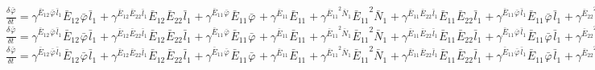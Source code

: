 $\frac{{\delta}^{} {\bar{\varphi}}_{}}{{\delta} {{{t}}_{}}^{}} = {\gamma}^{{{{\bar{E}}_{12}}^{}{{\bar{\varphi}}_{}}^{}{{\bar{l}}_{1}}^{}}}{{{\bar{E}}_{12}}^{}{{\bar{\varphi}}_{}}^{}{{\bar{l}}_{1}}^{}} + {\gamma}^{{{{\bar{E}}_{12}}^{}{{\bar{E}}_{22}}^{}{{\bar{l}}_{1}}^{}}}{{{\bar{E}}_{12}}^{}{{\bar{E}}_{22}}^{}{{\bar{l}}_{1}}^{}} + {\gamma}^{{{{\bar{E}}_{11}}^{}{{\bar{\varphi}}_{}}^{}}}{{{\bar{E}}_{11}}^{}{{\bar{\varphi}}_{}}^{}} + {\gamma}^{{{{\bar{E}}_{11}}^{}}}{{{\bar{E}}_{11}}^{}} + {\gamma}^{{{{\bar{E}}_{11}}^{2}{{\bar{N}}_{1}}^{}}}{{{\bar{E}}_{11}}^{2}{{\bar{N}}_{1}}^{}} + {\gamma}^{{{{\bar{E}}_{11}}^{}{{\bar{E}}_{22}}^{}{{\bar{l}}_{1}}^{}}}{{{\bar{E}}_{11}}^{}{{\bar{E}}_{22}}^{}{{\bar{l}}_{1}}^{}} + {\gamma}^{{{{\bar{E}}_{11}}^{}{{\bar{\varphi}}_{}}^{}{{\bar{l}}_{1}}^{}}}{{{\bar{E}}_{11}}^{}{{\bar{\varphi}}_{}}^{}{{\bar{l}}_{1}}^{}} + {\gamma}^{{{{\bar{E}}_{22}}^{2}{{\bar{l}}_{1}}^{}}}{{{\bar{E}}_{22}}^{2}{{\bar{l}}_{1}}^{}} + {\gamma}^{{{{\bar{E}}_{11}}^{}{{\bar{E}}_{22}}^{}{{\bar{l}}_{2}}^{}}}{{{\bar{E}}_{11}}^{}{{\bar{E}}_{22}}^{}{{\bar{l}}_{2}}^{}} + {\gamma}^{{{{\bar{E}}_{22}}^{}{{\bar{\varphi}}_{}}^{}{{\bar{l}}_{1}}^{}}}{{{\bar{E}}_{22}}^{}{{\bar{\varphi}}_{}}^{}{{\bar{l}}_{1}}^{}}$
$\frac{{\delta}^{} {\bar{\varphi}}_{}}{{\delta} {{{t}}_{}}^{}} = {\gamma}^{{{{\bar{E}}_{12}}^{}{{\bar{\varphi}}_{}}^{}{{\bar{l}}_{1}}^{}}}{{{\bar{E}}_{12}}^{}{{\bar{\varphi}}_{}}^{}{{\bar{l}}_{1}}^{}} + {\gamma}^{{{{\bar{E}}_{12}}^{}{{\bar{E}}_{22}}^{}{{\bar{l}}_{1}}^{}}}{{{\bar{E}}_{12}}^{}{{\bar{E}}_{22}}^{}{{\bar{l}}_{1}}^{}} + {\gamma}^{{{{\bar{E}}_{11}}^{}{{\bar{\varphi}}_{}}^{}}}{{{\bar{E}}_{11}}^{}{{\bar{\varphi}}_{}}^{}} + {\gamma}^{{{{\bar{E}}_{11}}^{}}}{{{\bar{E}}_{11}}^{}} + {\gamma}^{{{{\bar{E}}_{11}}^{2}{{\bar{N}}_{1}}^{}}}{{{\bar{E}}_{11}}^{2}{{\bar{N}}_{1}}^{}} + {\gamma}^{{{{\bar{E}}_{11}}^{}{{\bar{E}}_{22}}^{}{{\bar{l}}_{1}}^{}}}{{{\bar{E}}_{11}}^{}{{\bar{E}}_{22}}^{}{{\bar{l}}_{1}}^{}} + {\gamma}^{{{{\bar{E}}_{11}}^{}{{\bar{\varphi}}_{}}^{}{{\bar{l}}_{1}}^{}}}{{{\bar{E}}_{11}}^{}{{\bar{\varphi}}_{}}^{}{{\bar{l}}_{1}}^{}} + {\gamma}^{{{{\bar{E}}_{22}}^{2}{{\bar{l}}_{1}}^{}}}{{{\bar{E}}_{22}}^{2}{{\bar{l}}_{1}}^{}} + {\gamma}^{{{{\bar{E}}_{11}}^{}{{\bar{E}}_{22}}^{}{{\bar{l}}_{2}}^{}}}{{{\bar{E}}_{11}}^{}{{\bar{E}}_{22}}^{}{{\bar{l}}_{2}}^{}}$
$\frac{{\delta}^{} {\bar{\varphi}}_{}}{{\delta} {{{t}}_{}}^{}} = {\gamma}^{{{{\bar{E}}_{12}}^{}{{\bar{\varphi}}_{}}^{}{{\bar{l}}_{1}}^{}}}{{{\bar{E}}_{12}}^{}{{\bar{\varphi}}_{}}^{}{{\bar{l}}_{1}}^{}} + {\gamma}^{{{{\bar{E}}_{12}}^{}{{\bar{E}}_{22}}^{}{{\bar{l}}_{1}}^{}}}{{{\bar{E}}_{12}}^{}{{\bar{E}}_{22}}^{}{{\bar{l}}_{1}}^{}} + {\gamma}^{{{{\bar{E}}_{11}}^{}{{\bar{\varphi}}_{}}^{}}}{{{\bar{E}}_{11}}^{}{{\bar{\varphi}}_{}}^{}} + {\gamma}^{{{{\bar{E}}_{11}}^{}}}{{{\bar{E}}_{11}}^{}} + {\gamma}^{{{{\bar{E}}_{11}}^{2}{{\bar{N}}_{1}}^{}}}{{{\bar{E}}_{11}}^{2}{{\bar{N}}_{1}}^{}} + {\gamma}^{{{{\bar{E}}_{11}}^{}{{\bar{E}}_{22}}^{}{{\bar{l}}_{1}}^{}}}{{{\bar{E}}_{11}}^{}{{\bar{E}}_{22}}^{}{{\bar{l}}_{1}}^{}} + {\gamma}^{{{{\bar{E}}_{11}}^{}{{\bar{\varphi}}_{}}^{}{{\bar{l}}_{1}}^{}}}{{{\bar{E}}_{11}}^{}{{\bar{\varphi}}_{}}^{}{{\bar{l}}_{1}}^{}} + {\gamma}^{{{{\bar{E}}_{22}}^{2}{{\bar{l}}_{1}}^{}}}{{{\bar{E}}_{22}}^{2}{{\bar{l}}_{1}}^{}}$
